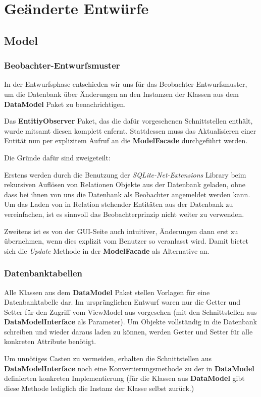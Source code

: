 \documentclass[a4paper]{scrreprt}
\begin{document}
\section{Geänderte Entwürfe}
\subsection{Model}
\subsubsection{Beobachter-Entwurfsmuster}
In der Entwurfsphase entschieden wir uns für das Beobachter-Entwurfsmuster, um die Datenbank über Änderungen an den Instanzen der Klassen aus dem \textbf{DataModel} Paket zu benachrichtigen.

Das \textbf{EntitiyObserver} Paket, das die dafür vorgesehenen Schnittstellen enthält, wurde mitsamt diesen komplett enfernt. Stattdessen muss das Aktualisieren einer Entität nun per explizitem Aufruf an die \textbf{ModelFacade} durchgeführt werden.

Die Gründe dafür sind zweigeteilt:

Erstens werden durch die Benutzung der \textit{SQLite-Net-Extensions} Library beim rekursiven Auflösen von Relationen Objekte aus der Datenbank geladen, ohne dass bei ihnen von uns die Datenbank als Beobachter angemeldet werden kann. Um das Laden von in Relation stehender Entitäten aus der Datenbank zu vereinfachen, ist es sinnvoll das Beobachterprinzip nicht weiter zu verwenden.

Zweitens ist es von der GUI-Seite auch intuitiver, Änderungen dann erst zu übernehmen, wenn dies explizit vom Benutzer so veranlasst wird. Damit bietet sich die \textit{Update} Methode in der \textbf{ModelFacade} als Alternative an.

\subsubsection{Datenbanktabellen}
Alle Klassen aus dem \textbf{DataModel} Paket stellen Vorlagen für eine Datenbanktabelle dar. Im ursprünglichen Entwurf waren nur die Getter und Setter für den Zugriff vom ViewModel aus vorgesehen (mit den Schnittstellen aus \textbf{DataModelInterface} als Parameter). Um Objekte vollständig in die Datenbank schreiben und wieder daraus laden zu können,  werden Getter und Setter für alle konkreten Attribute benötigt.

Um unnötiges Casten zu vermeiden, erhalten die Schnittstellen aus \textbf{DataModelInterface} noch eine Konvertierungsmethode zu der in \textbf{DataModel} definierten konkreten Implementierung (für die Klassen aus \textbf{DataModel} gibt diese Methode lediglich die Instanz der Klasse selbst zurück.)
\end{document}
